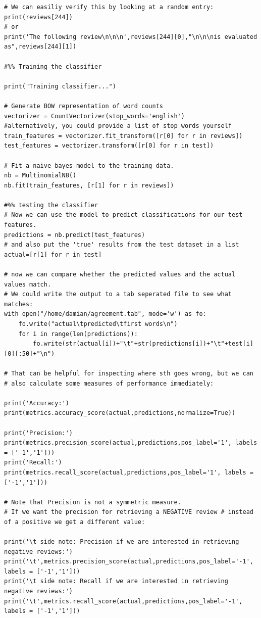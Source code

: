 \documentclass[a4paper,12pt]{book}
\begin{document}
\begin{lstlisting}
# We can easiliy verify this by looking at a random entry:
print(reviews[244])
# or
print('The following review\n\n\n',reviews[244][0],"\n\n\nis evaluated as",reviews[244][1])
    
#%% Training the classifier                

print("Training classifier...")        

# Generate BOW representation of word counts
vectorizer = CountVectorizer(stop_words='english')   
#alternatively, you could provide a list of stop words yourself
train_features = vectorizer.fit_transform([r[0] for r in reviews])
test_features = vectorizer.transform([r[0] for r in test])

# Fit a naive bayes model to the training data.
nb = MultinomialNB()
nb.fit(train_features, [r[1] for r in reviews])

#%% testing the classifier
# Now we can use the model to predict classifications for our test features.
predictions = nb.predict(test_features)
# and also put the 'true' results from the test dataset in a list
actual=[r[1] for r in test]

# now we can compare whether the predicted values and the actual values match.
# We could write the output to a tab seperated file to see what matches:
with open("/home/damian/agreement.tab", mode='w') as fo:
    fo.write("actual\tpredicted\tfirst words\n")
    for i in range(len(predictions)):
        fo.write(str(actual[i])+"\t"+str(predictions[i])+"\t"+test[i][0][:50]+"\n")

# That can be helpful for inspecting where sth goes wrong, but we can  
# also calculate some measures of performance immediately:

print('Accuracy:')
print(metrics.accuracy_score(actual,predictions,normalize=True))

print('Precision:')
print(metrics.precision_score(actual,predictions,pos_label='1', labels = ['-1','1']))
print('Recall:')
print(metrics.recall_score(actual,predictions,pos_label='1', labels = ['-1','1']))

# Note that Precision is not a symmetric measure.
# If we want the precision for retrieving a NEGATIVE review # instead of a positive we get a different value:

print('\t side note: Precision if we are interested in retrieving negative reviews:')
print('\t',metrics.precision_score(actual,predictions,pos_label='-1', labels = ['-1','1']))
print('\t side note: Recall if we are interested in retrieving negative reviews:')
print('\t',metrics.recall_score(actual,predictions,pos_label='-1', labels = ['-1','1']))


\end{lstlisting}
\end{document}
